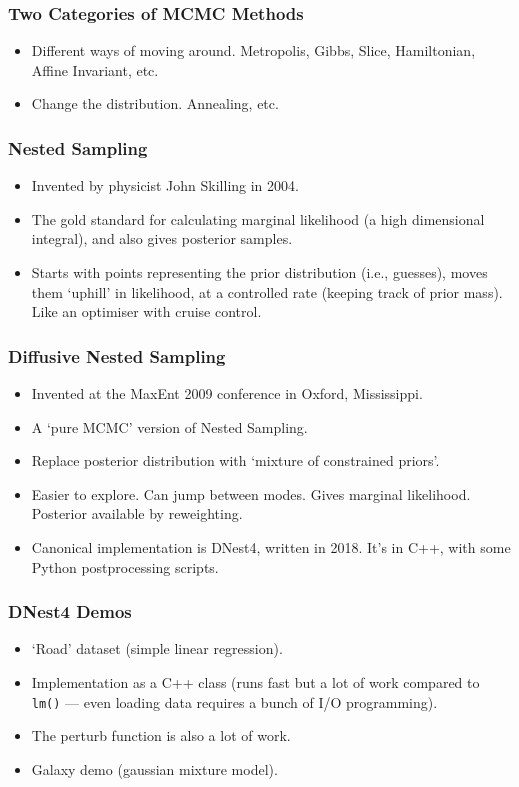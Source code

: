 \documentclass{beamer}
\begin{document}
\begin{frame}
\frametitle{Two Categories of MCMC Methods}
\begin{itemize}
\item Different ways of moving around. Metropolis, Gibbs, Slice, Hamiltonian,
Affine Invariant, etc.\pause
\item Change the distribution. Annealing, etc.
\end{itemize}


\end{frame}



\begin{frame}
\frametitle{Nested Sampling}
\begin{itemize}
\item Invented by physicist John Skilling in 2004.\pause
\item The gold standard for calculating marginal likelihood (a high dimensional
integral), and also gives posterior samples.\pause
\item Starts with points representing the prior distribution (i.e., guesses),
moves them `uphill' in likelihood, at a controlled rate (keeping track
of prior mass). Like an optimiser
with cruise control.
\end{itemize}
\end{frame}

\begin{frame}
\frametitle{Diffusive Nested Sampling}
\begin{itemize}
\item Invented at the MaxEnt 2009 conference in Oxford, Mississippi.\pause
\item A `pure MCMC' version of Nested Sampling.\pause
\item Replace posterior distribution with `mixture of constrained priors'.\pause
\item Easier to explore. Can jump between modes. Gives marginal likelihood.
Posterior available by reweighting.\pause
\item Canonical implementation is DNest4, written in 2018. It's in C++,
with some Python postprocessing scripts.
\end{itemize}
\end{frame}


\begin{frame}
\frametitle{DNest4 Demos}
\begin{itemize}
\item `Road' dataset (simple linear regression).\pause
\item Implementation as a C++ class (runs fast but a lot of work
compared to \texttt{lm()} --- even loading
data requires a bunch of I/O programming).\pause
\item The perturb function is also a lot of work.\pause
\item Galaxy demo (gaussian mixture model).
\end{itemize}
\end{frame}
\end{document}
